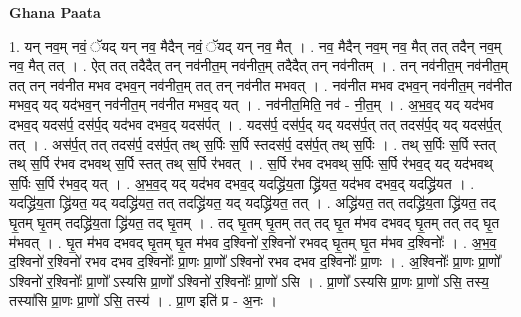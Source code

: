 \documentclass[17pt]{extarticle}
\begin{document}
\textbf{Ghana Paata } \newline

1. यन् नव॒म् नवं॒ ॅयद् यन् नव॒ मैदैन् नवं॒ ॅयद् यन् नव॒ मैत् । . नव॒ मैदैन् नव॒म् नव॒ मैत् तत् तदैन् नव॒म् नव॒ मैत् तत् । . ऐत् तत् तदैदैत् तन् नव॑नीत॒म् नव॑नीत॒म् तदैदैत् तन् नव॑नीतम् । . तन् नव॑नीत॒म् नव॑नीत॒म् तत् तन् नव॑नीत मभव दभव॒न् नव॑नीत॒म् तत् तन् नव॑नीत मभवत् । . नव॑नीत मभव दभव॒न् नव॑नीत॒म् नव॑नीत मभव॒द् यद् यद॑भव॒न् नव॑नीत॒म् नव॑नीत मभव॒द् यत् । . नव॑नीत॒मिति॒ नव॑ - नी॒त॒म् । . अ॒भ॒व॒द् यद् यद॑भव दभव॒द् यदस॑र्प॒ दस॑र्प॒द् यद॑भव दभव॒द् यदस॑र्पत् । . यदस॑र्प॒ दस॑र्प॒द् यद् यदस॑र्प॒त् तत् तदस॑र्प॒द् यद् यदस॑र्प॒त् तत् । . अस॑र्प॒त् तत् तदस॑र्प॒ दस॑र्प॒त् तथ् स॒र्पिः स॒र्पि स्तदस॑र्प॒ दस॑र्प॒त् तथ् स॒र्पिः । . तथ् स॒र्पिः स॒र्पि स्तत् तथ् स॒र्पि र॑भव दभवथ् स॒र्पि स्तत् तथ् स॒र्पि र॑भवत् । . स॒र्पि र॑भव दभवथ् स॒र्पिः स॒र्पि र॑भव॒द् यद् यद॑भवथ् स॒र्पिः स॒र्पि र॑भव॒द् यत् । . अ॒भ॒व॒द् यद् यद॑भव दभव॒द् यदद्ध्रि॑य॒ता द्ध्रि॑यत॒ यद॑भव दभव॒द् यदद्ध्रि॑यत । . यदद्ध्रि॑य॒ता द्ध्रि॑यत॒ यद् यदद्ध्रि॑यत॒ तत् तदद्ध्रि॑यत॒ यद् यदद्ध्रि॑यत॒ तत् । . अद्ध्रि॑यत॒ तत् तदद्ध्रि॑य॒ता द्ध्रि॑यत॒ तद् घृ॒तम् घृ॒तम् तदद्ध्रि॑य॒ता द्ध्रि॑यत॒ तद् घृ॒तम् । . तद् घृ॒तम् घृ॒तम् तत् तद् घृ॒त म॑भव दभवद् घृ॒तम् तत् तद् घृ॒त म॑भवत् । . घृ॒त म॑भव दभवद् घृ॒तम् घृ॒त म॑भव द॒श्विनो॑ र॒श्विनो॑ रभवद् घृ॒तम् घृ॒त म॑भव द॒श्विनोः᳚ । . अ॒भ॒व॒ द॒श्विनो॑ र॒श्विनो॑ रभव दभव द॒श्विनोः᳚ प्रा॒णः प्रा॒णो᳚ ऽश्विनो॑ रभव दभव द॒श्विनोः᳚ प्रा॒णः । . अ॒श्विनोः᳚ प्रा॒णः प्रा॒णो᳚ ऽश्विनो॑ र॒श्विनोः᳚ प्रा॒णो᳚ ऽस्यसि प्रा॒णो᳚ ऽश्विनो॑ र॒श्विनोः᳚ प्रा॒णो॑ ऽसि । . प्रा॒णो᳚ ऽस्यसि प्रा॒णः प्रा॒णो॑ ऽसि॒ तस्य॒ तस्या॑सि प्रा॒णः प्रा॒णो॑ ऽसि॒ तस्य॑ । . प्रा॒ण इति॑ प्र - अ॒नः । \newline
\end{document}
